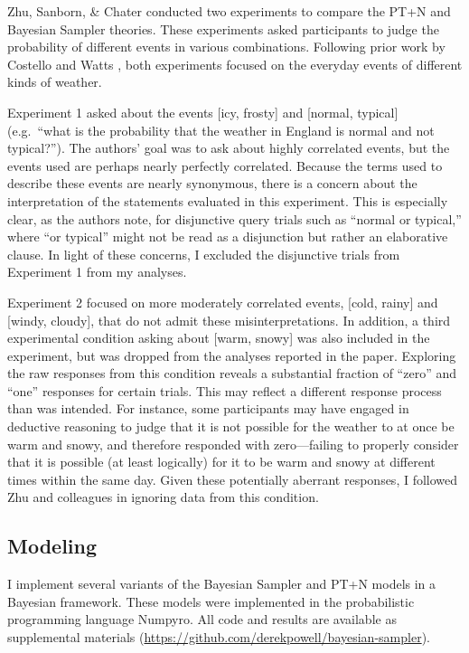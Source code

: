 \documentclass[
  man,floatsintext]{apa6}
\begin{document}
Zhu, Sanborn, \& Chater \autocite*{chater.etal2020} conducted two experiments to compare the PT+N and Bayesian Sampler theories. These experiments asked participants to judge the probability of different events in various combinations. Following prior work by Costello and Watts \autocites*[e.g.][]{costello.watts2016,costello.watts2018}, both experiments focused on the everyday events of different kinds of weather.

Experiment 1 asked about the events {[}icy, frosty{]} and {[}normal, typical{]} (e.g.~``what is the probability that the weather in England is normal and not typical?''). The authors' goal was to ask about highly correlated events, but the events used are perhaps nearly perfectly correlated. Because the terms used to describe these events are nearly synonymous, there is a concern about the interpretation of the statements evaluated in this experiment. This is especially clear, as the authors note, for disjunctive query trials such as ``normal or typical,'' where ``or typical'' might not be read as a disjunction but rather an elaborative clause. In light of these concerns, I excluded the disjunctive trials from Experiment 1 from my analyses.

Experiment 2 focused on more moderately correlated events, {[}cold, rainy{]} and {[}windy, cloudy{]}, that do not admit these misinterpretations. In addition, a third experimental condition asking about {[}warm, snowy{]} was also included in the experiment, but was dropped from the analyses reported in the paper. Exploring the raw responses from this condition reveals a substantial fraction of ``zero'' and ``one'' responses for certain trials. This may reflect a different response process than was intended. For instance, some participants may have engaged in deductive reasoning to judge that it is not possible for the weather to at once be warm and snowy, and therefore responded with zero---failing to properly consider that it is possible (at least logically) for it to be warm and snowy at different times within the same day. Given these potentially aberrant responses, I followed Zhu and colleagues \autocite*{zhu.etal2020} in ignoring data from this condition.

\hypertarget{modeling}{%
\subsection{Modeling}\label{modeling}}

I implement several variants of the Bayesian Sampler and PT+N models in a Bayesian framework. These models were implemented in the probabilistic programming language Numpyro. All code and results are available as supplemental materials (\url{https://github.com/derekpowell/bayesian-sampler}).
\end{document}
